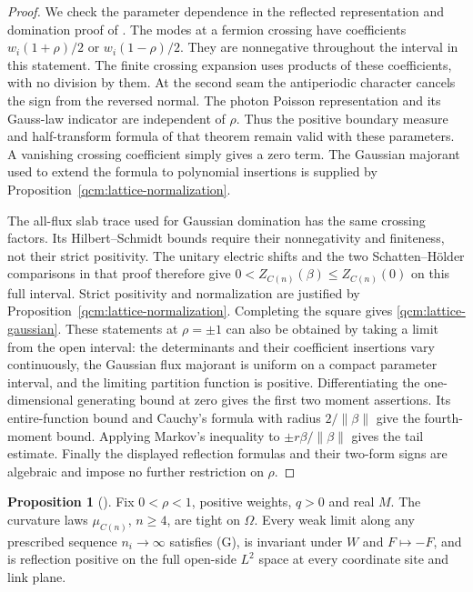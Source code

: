 \documentclass[11pt,letterpaper,reqno]{amsart}
\theoremstyle{definition}
\newtheorem{qcmproposition}{Proposition}[section]
\newenvironment{proposition}[1][]{\pushQED{\qed}\renewcommand{\qedsymbol}{$\blacksquare$}\begin{qcmproposition}[#1]}{\popQED\end{qcmproposition}}
\begin{document}
\begin{proof}
We check the parameter dependence in the reflected representation
and domination proof of
\cite[Proposition~2.4, Theorem~2.5 and Theorem~3.5]{QEDConstruction}.
The modes at a fermion crossing have coefficients
$w_i(1+\rho)/2$ or $w_i(1-\rho)/2$. They are nonnegative throughout
the interval in this statement. The finite crossing expansion uses
products of these coefficients, with no division by them. At the
second seam the antiperiodic character cancels the sign from the
reversed normal. The photon Poisson representation and its Gauss-law
indicator are independent of $\rho$. Thus the positive boundary
measure and half-transform formula of that theorem remain valid
with these parameters. A vanishing crossing coefficient simply gives
a zero term. The Gaussian majorant used to extend the formula to
polynomial insertions is supplied by
Proposition~\ref{qcm:lattice-normalization}.

The all-flux slab trace used for Gaussian domination has the same
crossing factors. Its Hilbert--Schmidt bounds require their
nonnegativity and finiteness, not their strict positivity. The
unitary electric shifts and the two Schatten--H\"older comparisons
in that proof therefore give
$0<Z_{C(n)}(\beta)\le Z_{C(n)}(0)$ on this full interval.
Strict positivity and normalization are justified by
Proposition~\ref{qcm:lattice-normalization}. Completing the square
gives \eqref{qcm:lattice-gaussian}. These statements at $\rho=\pm1$
can also be obtained by taking a limit from the open interval: the
determinants and their coefficient insertions vary continuously,
the Gaussian flux majorant is uniform on a compact parameter
interval, and the limiting partition function is positive.
Differentiating the one-dimensional generating bound at zero gives
the first two moment assertions. Its entire-function bound and
Cauchy's formula with radius $2/\|\beta\|$ give the fourth-moment
bound. Applying Markov's inequality to $\pm r\beta/\|\beta\|$
gives the tail estimate. Finally the displayed reflection formulas
and their two-form signs are algebraic and impose no further
restriction on $\rho$.
\end{proof}

\begin{proposition}\label{qcm:lattice-coordinate-limits}
Fix $0<\rho<1$, positive weights, $q>0$ and real $M$. The curvature
laws $\mu_{C(n)}$, $n\ge4$, are tight on $\Omega$. Every weak limit
along any prescribed sequence $n_i\to\infty$ satisfies (G), is
invariant under $W$ and $F\mapsto-F$, and is reflection positive
on the full open-side $L^2$ space at every coordinate site and link
plane.
\end{proposition}
\end{document}
